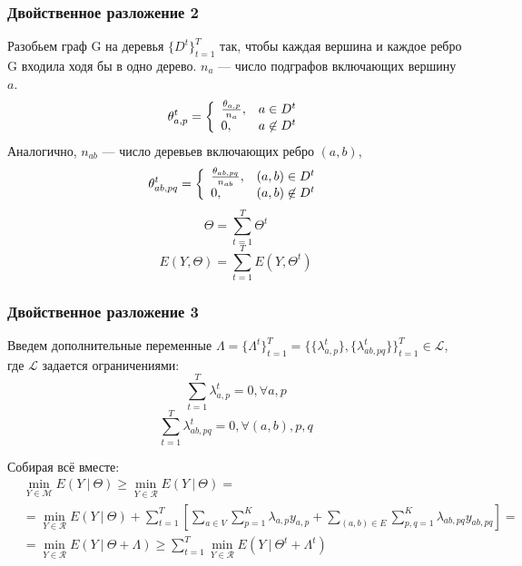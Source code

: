 \documentclass[smaller,unicode,hyperref={unicode=true}]{beamer}
\begin{document}
\begin{frame}
  \frametitle{Двойственное разложение 2}
  Разобьем граф G на деревья $\{D^t\}_{t=1}^T$ так, чтобы каждая вершина и каждое ребро G входила ходя бы в одно дерево. $n_a$ --- число подграфов включающих вершину $a$.
  \begin{equation*}
    \theta_{a,p}^t = \left\{ 
  \begin{array}{l l}
    \frac{\theta_{a,p}}{n_a}, & a \in D^t\\
    0, & a \not \in D^t
  \end{array} \right.
  \end{equation*}
  Аналогично, $n_{ab}$ --- число деревьев включающих ребро $(a, b)$,
  \begin{equation*}
    \theta_{ab,pq}^t = \left\{ 
  \begin{array}{l l}
    \frac{\theta_{ab,pq}}{n_{ab}}, & (a,b) \in D^t\\
    0, & (a,b) \not \in D^t
  \end{array} \right.
  \end{equation*}
  \begin{equation*}
    \Theta = \sum_{t = 1}^{T} \Theta^t
  \end{equation*}
  \begin{equation*}
    E(Y, \Theta) = \sum_{t = 1}^{T} E(Y, \Theta^t)
  \end{equation*}
\end{frame}

\begin{frame}
  \frametitle{Двойственное разложение 3}
  Введем дополнительные переменные $\Lambda = \{\Lambda^t\}_{t=1}^T = \{\{\lambda_{a,p}^t\},\{\lambda_{ab,pq}^t\}\}_{t=1}^T \in \mathcal{L}$, где $\mathcal{L}$ задается ограничениями:
  \begin{equation*}
    \sum_{t = 1}^{T} \lambda_{a,p}^t = 0, \forall a, p
  \end{equation*}
  \begin{equation*}
    \sum_{t = 1}^{T} \lambda_{ab,pq}^t = 0, \forall (a, b), p,q
  \end{equation*}

  Собирая всё вместе:
  \begin{align*}
    &\min_{Y \in \mathcal{M}} E(Y~|~\Theta) \geq \min_{Y \in \mathcal{R}} E(Y~|~\Theta) = \\
    &= \min_{Y \in \mathcal{R}} E(Y~|~\Theta) + \sum_{t = 1}^{T} \left [ \sum_{a \in V} \sum_{p = 1}^{K} \lambda_{a,p} y_{a,p} + \sum_{(a,b) \in E} \sum_{p,q = 1}^{K} \lambda_{ab,pq} y_{ab,pq} \right] = \\
    &=\min_{Y \in \mathcal{R}} E(Y~|~\Theta + \Lambda) \geq \sum_{t = 1}^{T} \min_{Y \in \mathcal{R}} E(Y~|~\Theta^t + \Lambda^t)
  \end{align*}
\end{frame}
\end{document}
